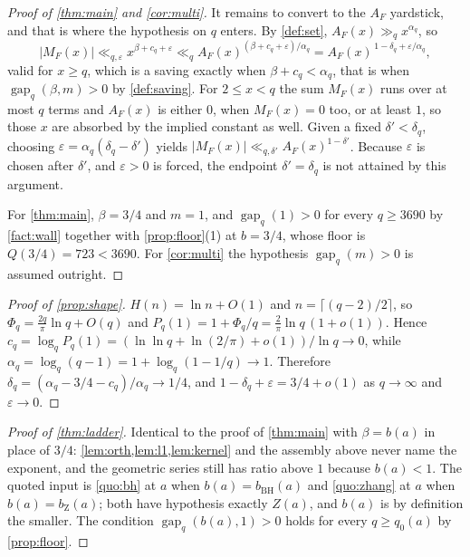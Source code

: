 \documentclass[11pt]{amsart}
\theoremstyle{definition}
\theoremstyle{remark}
\begin{document}
\begin{proof}[Proof of \cref{thm:main} and \cref{cor:multi}]
It remains to convert to the $A_F$ yardstick, and that is where the hypothesis on $q$ enters. By \cref{def:set}, $A_F(x) \gg_q x^{\alpha_q}$, so
\[
  |M_F(x)| \ll_{q,\varepsilon} x^{\beta + c_q + \varepsilon} \ll_q A_F(x)^{(\beta + c_q + \varepsilon)/\alpha_q}
  = A_F(x)^{\,1 - \delta_q + \varepsilon/\alpha_q},
\]
valid for $x \ge q$, which is a saving exactly when $\beta + c_q < \alpha_q$, that is when $\operatorname{gap}_q(\beta, m) > 0$ by \cref{def:saving}. For $2 \le x < q$ the sum $M_F(x)$ runs over at most $q$ terms and $A_F(x)$ is either $0$, when $M_F(x) = 0$ too, or at least $1$, so those $x$ are absorbed by the implied constant as well. Given a fixed $\delta' < \delta_q$, choosing $\varepsilon = \alpha_q(\delta_q - \delta')$ yields $|M_F(x)| \ll_{q,\delta'} A_F(x)^{1-\delta'}$. Because $\varepsilon$ is chosen after $\delta'$, and $\varepsilon > 0$ is forced, the endpoint $\delta' = \delta_q$ is not attained by this argument.

For \cref{thm:main}, $\beta = 3/4$ and $m = 1$, and $\operatorname{gap}_q(1) > 0$ for every $q \ge 3690$ by \cref{fact:wall} together with \cref{prop:floor}(1) at $b = 3/4$, whose floor is $Q(3/4) = 723 < 3690$. For \cref{cor:multi} the hypothesis $\operatorname{gap}_q(m) > 0$ is assumed outright.
\end{proof}

\begin{proof}[Proof of \cref{prop:shape}]
$H(n) = \ln n + O(1)$ and $n = \lceil (q-2)/2 \rceil$, so $\Phi_q = \frac{2q}{\pi}\ln q + O(q)$ and $P_q(1) = 1 + \Phi_q/q = \frac{2}{\pi} \ln q\,(1 + o(1))$. Hence $c_q = \log_q P_q(1) = (\ln\ln q + \ln(2/\pi) + o(1))/\ln q \to 0$, while $\alpha_q = \log_q(q-1) = 1 + \log_q(1 - 1/q) \to 1$. Therefore $\delta_q = (\alpha_q - 3/4 - c_q)/\alpha_q \to 1/4$, and $1 - \delta_q + \varepsilon = 3/4 + o(1)$ as $q \to \infty$ and $\varepsilon \to 0$.
\end{proof}

\begin{proof}[Proof of \cref{thm:ladder}]
Identical to the proof of \cref{thm:main} with $\beta = b(a)$ in place of $3/4$: \cref{lem:orth,lem:l1,lem:kernel} and the assembly above never name the exponent, and the geometric series still has ratio above $1$ because $b(a) < 1$. The quoted input is \cref{quo:bh} at $a$ when $b(a) = b_{\mathrm{BH}}(a)$ and \cref{quo:zhang} at $a$ when $b(a) = b_{\mathrm Z}(a)$; both have hypothesis exactly $Z(a)$, and $b(a)$ is by definition the smaller. The condition $\operatorname{gap}_q(b(a), 1) > 0$ holds for every $q \ge q_0(a)$ by \cref{prop:floor}.
\end{proof}
\end{document}

